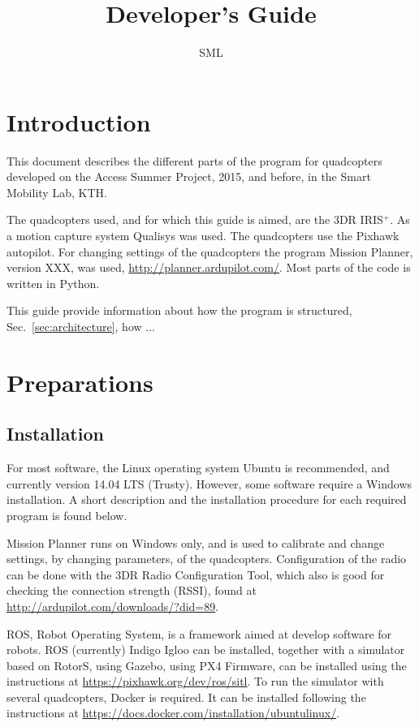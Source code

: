 \documentclass[titlepage,11pt,a4paper]{article}
\title{Developer's Guide} \author{SML}
\begin{document}
\maketitle \tableofcontents
\newpage

\section{Introduction}
This document describes the different parts of the program for
quadcopters developed on the Access Summer Project, 2015, and before,
in the Smart Mobility Lab, KTH.

The quadcopters used, and for which this guide is aimed, are the 3DR
IRIS$^+$. As a motion capture system Qualisys was used. The
quadcopters use the Pixhawk autopilot. For changing settings of the
quadcopters the program Mission Planner, version XXX, was used,
\url{http://planner.ardupilot.com/}. Most parts of the code is written
in Python.

This guide provide information about how the program is structured,
Sec.~\ref{sec:architecture}, how ...

\section{Preparations}

\subsection{Installation}
For most software, the Linux operating system Ubuntu is
recommended, and currently version 14.04 LTS (Trusty). However, some software require a Windows
installation. A short description and the installation procedure for each
required program is found below.

Mission Planner runs on Windows only, and is used to calibrate and change settings, by
changing parameters, of the quadcopters. Configuration of the radio
can be done with the 3DR Radio Configuration Tool, which also is good
for checking the connection strength (RSSI), found at
\url{http://ardupilot.com/downloads/?did=89}.

ROS, Robot Operating System, is
a framework aimed at develop software for robots. ROS (currently)
Indigo Igloo can be installed, together with a simulator based on
RotorS, using Gazebo, using PX4 Firmware, can be installed using the
instructions at \url{https://pixhawk.org/dev/ros/sitl}. To run the
simulator with several quadcopters, Docker is required. It
can be installed following the instructions at
\url{https://docs.docker.com/installation/ubuntulinux/}.
\end{document}
